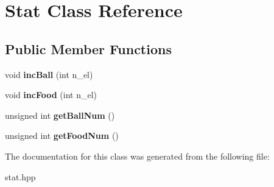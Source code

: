 \hypertarget{classStat}{}\section{Stat Class Reference}
\label{classStat}
\subsection*{Public Member Functions}
\begin{DoxyCompactItemize}
\item 
void {\bfseries inc\+Ball} (int n\+\_\+el)\hypertarget{classStat_ae1dda7b0b01089498ca35cd4f45dfe94}{}\label{classStat_ae1dda7b0b01089498ca35cd4f45dfe94}

\item 
void {\bfseries inc\+Food} (int n\+\_\+el)\hypertarget{classStat_a5f11708a373ed11156f258042a7c7e31}{}\label{classStat_a5f11708a373ed11156f258042a7c7e31}

\item 
unsigned int {\bfseries get\+Ball\+Num} ()\hypertarget{classStat_afb3369e17c80bdbcb76453d56391f89e}{}\label{classStat_afb3369e17c80bdbcb76453d56391f89e}

\item 
unsigned int {\bfseries get\+Food\+Num} ()\hypertarget{classStat_a49c7ba4e42cf84e8061d956f214c846c}{}\label{classStat_a49c7ba4e42cf84e8061d956f214c846c}

\end{DoxyCompactItemize}


The documentation for this class was generated from the following file\+:\begin{DoxyCompactItemize}
\item 
stat.\+hpp\end{DoxyCompactItemize}
